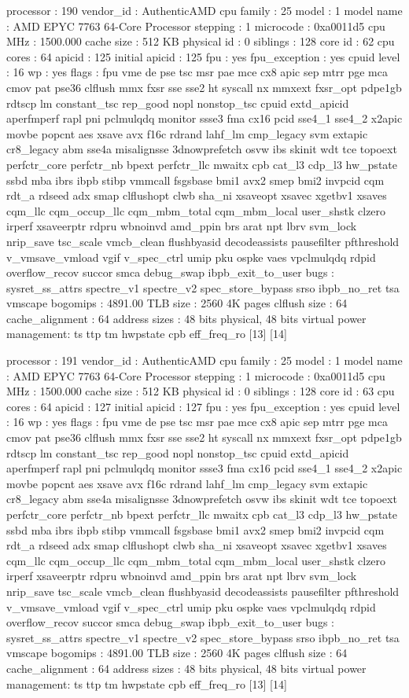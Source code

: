 processor	: 190
vendor_id	: AuthenticAMD
cpu family	: 25
model		: 1
model name	: AMD EPYC 7763 64-Core Processor
stepping	: 1
microcode	: 0xa0011d5
cpu MHz		: 1500.000
cache size	: 512 KB
physical id	: 0
siblings	: 128
core id		: 62
cpu cores	: 64
apicid		: 125
initial apicid	: 125
fpu		: yes
fpu_exception	: yes
cpuid level	: 16
wp		: yes
flags		: fpu vme de pse tsc msr pae mce cx8 apic sep mtrr pge mca cmov pat pse36 clflush mmx fxsr sse sse2 ht syscall nx mmxext fxsr_opt pdpe1gb rdtscp lm constant_tsc rep_good nopl nonstop_tsc cpuid extd_apicid aperfmperf rapl pni pclmulqdq monitor ssse3 fma cx16 pcid sse4_1 sse4_2 x2apic movbe popcnt aes xsave avx f16c rdrand lahf_lm cmp_legacy svm extapic cr8_legacy abm sse4a misalignsse 3dnowprefetch osvw ibs skinit wdt tce topoext perfctr_core perfctr_nb bpext perfctr_llc mwaitx cpb cat_l3 cdp_l3 hw_pstate ssbd mba ibrs ibpb stibp vmmcall fsgsbase bmi1 avx2 smep bmi2 invpcid cqm rdt_a rdseed adx smap clflushopt clwb sha_ni xsaveopt xsavec xgetbv1 xsaves cqm_llc cqm_occup_llc cqm_mbm_total cqm_mbm_local user_shstk clzero irperf xsaveerptr rdpru wbnoinvd amd_ppin brs arat npt lbrv svm_lock nrip_save tsc_scale vmcb_clean flushbyasid decodeassists pausefilter pfthreshold v_vmsave_vmload vgif v_spec_ctrl umip pku ospke vaes vpclmulqdq rdpid overflow_recov succor smca debug_swap ibpb_exit_to_user
bugs		: sysret_ss_attrs spectre_v1 spectre_v2 spec_store_bypass srso ibpb_no_ret tsa vmscape
bogomips	: 4891.00
TLB size	: 2560 4K pages
clflush size	: 64
cache_alignment	: 64
address sizes	: 48 bits physical, 48 bits virtual
power management: ts ttp tm hwpstate cpb eff_freq_ro [13] [14]

processor	: 191
vendor_id	: AuthenticAMD
cpu family	: 25
model		: 1
model name	: AMD EPYC 7763 64-Core Processor
stepping	: 1
microcode	: 0xa0011d5
cpu MHz		: 1500.000
cache size	: 512 KB
physical id	: 0
siblings	: 128
core id		: 63
cpu cores	: 64
apicid		: 127
initial apicid	: 127
fpu		: yes
fpu_exception	: yes
cpuid level	: 16
wp		: yes
flags		: fpu vme de pse tsc msr pae mce cx8 apic sep mtrr pge mca cmov pat pse36 clflush mmx fxsr sse sse2 ht syscall nx mmxext fxsr_opt pdpe1gb rdtscp lm constant_tsc rep_good nopl nonstop_tsc cpuid extd_apicid aperfmperf rapl pni pclmulqdq monitor ssse3 fma cx16 pcid sse4_1 sse4_2 x2apic movbe popcnt aes xsave avx f16c rdrand lahf_lm cmp_legacy svm extapic cr8_legacy abm sse4a misalignsse 3dnowprefetch osvw ibs skinit wdt tce topoext perfctr_core perfctr_nb bpext perfctr_llc mwaitx cpb cat_l3 cdp_l3 hw_pstate ssbd mba ibrs ibpb stibp vmmcall fsgsbase bmi1 avx2 smep bmi2 invpcid cqm rdt_a rdseed adx smap clflushopt clwb sha_ni xsaveopt xsavec xgetbv1 xsaves cqm_llc cqm_occup_llc cqm_mbm_total cqm_mbm_local user_shstk clzero irperf xsaveerptr rdpru wbnoinvd amd_ppin brs arat npt lbrv svm_lock nrip_save tsc_scale vmcb_clean flushbyasid decodeassists pausefilter pfthreshold v_vmsave_vmload vgif v_spec_ctrl umip pku ospke vaes vpclmulqdq rdpid overflow_recov succor smca debug_swap ibpb_exit_to_user
bugs		: sysret_ss_attrs spectre_v1 spectre_v2 spec_store_bypass srso ibpb_no_ret tsa vmscape
bogomips	: 4891.00
TLB size	: 2560 4K pages
clflush size	: 64
cache_alignment	: 64
address sizes	: 48 bits physical, 48 bits virtual
power management: ts ttp tm hwpstate cpb eff_freq_ro [13] [14]

